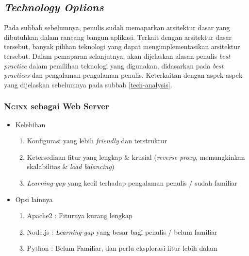 
\subsection{\textit{Technology Options}}
\label{tech-options}

	Pada subbab sebelumnya, penulis sudah memaparkan arsitektur dasar yang dibutuhkan dalam rancang bangun aplikasi. Terkait dengan arsitektur dasar tersebut, banyak pilihan teknologi yang dapat mengimplementasikan arsitektur tersebut. Dalam pemaparan selanjutnya, akan dijelaskan alasan penulis \textit{best practice} dalam pemilihan teknologi yang digunakan, didasarkan pada \textit{best practices} dan pengalaman-pengalaman penulis. Keterkaitan dengan aspek-aspek yang dijelaskan sebelumnya pada subbab \ref{tech-analysis}.
	
	\subsubsection{\textsc{Nginx} sebagai Web Server}
		\begin{itemize}
			\item Kelebihan
				\begin{enumerate}
					\item Konfigurasi yang lebih \textit{friendly} dan terstruktur
					\item Ketersediaan fitur yang lengkap \& krusial (\textit{reverse proxy}, memungkinkan skalabilitas \& \textit{load balancing})
					\item \textit{Learning-gap} yang kecil terhadap pengalaman penulis / sudah familiar
				\end{enumerate}
			\item Opsi lainnya
				\begin{enumerate}
					\item Apache2 : Fiturnya kurang lengkap
					\item Node.js : \textit{Learning-gap} yang besar bagi penulis / belum familiar
					\item Python : Belum Familiar, dan perlu eksplorasi fitur lebih dalam
				\end{enumerate}
		\end{itemize}
	
